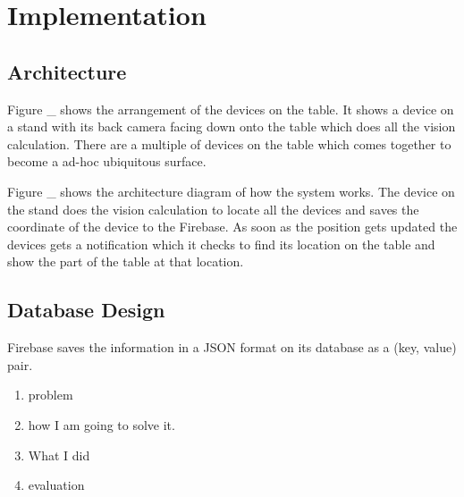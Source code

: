 \section{Implementation}
\subsection{Architecture}

Figure _ shows the arrangement of the devices on the table. It shows a device on a stand with its back camera facing down onto the table which does all the vision calculation. There are a multiple of devices on the table which comes together to become a ad-hoc ubiquitous surface.

Figure _ shows the architecture diagram of how the system works. The device on the stand does the vision calculation to locate all the devices and saves the coordinate of the device to the Firebase. As soon as the position gets updated the devices gets a notification which it checks to find its location on the table and show the part of the table at that location.

\subsection{Database Design}

Firebase saves the information in a JSON format on its database as a (key, value) pair.
\begin{enumerate}
\item problem 
\item how I am going to solve it.
\item What I did
\item evaluation
\end{enumerate}
    